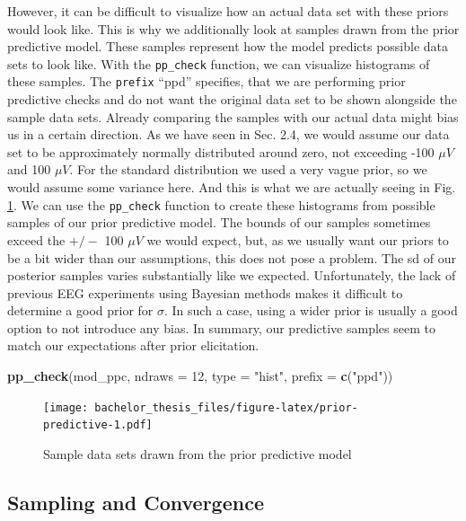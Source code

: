 \documentclass[
  doc,12pt,floatsintext]{apa7}
\newenvironment{Shaded}{\begin{snugshade}}{\end{snugshade}}
\newcommand{\AttributeTok}[1]{\textcolor[rgb]{0.13,0.29,0.53}{#1}}
\newcommand{\DecValTok}[1]{\textcolor[rgb]{0.00,0.00,0.81}{#1}}
\newcommand{\FunctionTok}[1]{\textcolor[rgb]{0.13,0.29,0.53}{\textbf{#1}}}
\newcommand{\NormalTok}[1]{#1}
\newcommand{\StringTok}[1]{\textcolor[rgb]{0.31,0.60,0.02}{#1}}
\begin{document}
However, it can be difficult to visualize how an actual data set with these priors would look like. This is why we additionally look at samples drawn from the prior predictive model. These samples represent how the model predicts possible data sets to look like. With the \texttt{pp\_check} function, we can visualize histograms of these samples. The \texttt{prefix} ``ppd'' specifies, that we are performing prior predictive checks and do not want the original data set to be shown alongside the sample data sets. Already comparing the samples with our actual data might bias us in a certain direction. As we have seen in Sec. 2.4, we would assume our data set to be approximately normally distributed around zero, not exceeding -100 \(\mu V\) and 100 \(\mu V\). For the standard distribution we used a very vague prior, so we would assume some variance here. And this is what we are actually seeing in Fig. \ref{fig:prior-predictive}. We can use the \texttt{pp\_check} function to create these histograms from possible samples of our prior predictive model. The bounds of our samples sometimes exceed the \(+/-\) 100 \(\mu V\) we would expect, but, as we usually want our priors to be a bit wider than our assumptions, this does not pose a problem. The sd of our posterior samples varies substantially like we expected. Unfortunately, the lack of previous EEG experiments using Bayesian methods makes it difficult to determine a good prior for \(\sigma\). In such a case, using a wider prior is usually a good option to not introduce any bias. In summary, our predictive samples seem to match our expectations after prior elicitation.



\begin{Shaded}
\begin{Highlighting}[]
\FunctionTok{pp\_check}\NormalTok{(mod\_ppc, }\AttributeTok{ndraws =} \DecValTok{12}\NormalTok{, }\AttributeTok{type =} \StringTok{"hist"}\NormalTok{, }\AttributeTok{prefix =} \FunctionTok{c}\NormalTok{(}\StringTok{"ppd"}\NormalTok{))}
\end{Highlighting}
\end{Shaded}

\begin{figure}
\centering
\texttt{[image: bachelor\_thesis\_files/figure-latex/prior-predictive-1.pdf]}
\caption{\label{fig:prior-predictive}Sample data sets drawn from the prior predictive model}
\end{figure}

\subsection{Sampling and Convergence}\label{sampling-and-convergence}
\end{document}
